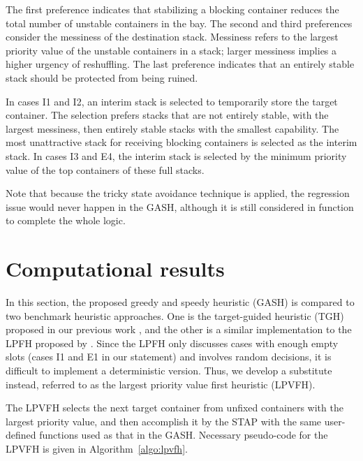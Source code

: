 \documentclass[review,3p,times,12pt,number]{elsarticle}\usepackage{amsmath}\usepackage{amssymb}
\begin{document}
The first preference indicates that stabilizing a blocking container reduces the total number of unstable containers in the bay. The second and third preferences consider the messiness of the destination stack. Messiness refers to the largest priority value of the unstable containers in a stack; larger messiness implies a higher urgency of reshuffling. The last preference indicates that an entirely stable stack should be protected from being ruined.

In cases I1 and I2, an interim stack is selected to temporarily store the target container. 
The selection prefers stacks that are not entirely stable, with the largest messiness, then entirely stable stacks with the smallest capability. The most unattractive stack for receiving blocking containers is selected as the interim stack. In cases I3 and E4, the interim stack is selected by the minimum priority value of the top containers of these full stacks.

Note that because the tricky state avoidance technique is applied, the regression issue would never happen in the GASH, although it is still considered in function  to complete the whole logic.

\section{Computational results}
\label{sec:experiment}

In this section, the proposed greedy and speedy heuristic (GASH) is compared to two benchmark heuristic approaches. One is the target-guided heuristic (TGH) proposed in our previous work \citep{wang2015}, and the other is a similar implementation to the LPFH proposed by \cite{exp2012}. Since the LPFH only discusses cases with enough empty slots (cases I1 and E1 in our statement) and involves random decisions, it is difficult to implement a deterministic version. Thus, we develop a substitute instead, referred to as the largest priority value first heuristic (LPVFH).

The LPVFH selects the next target container from unfixed containers with the largest priority value, and then accomplish it by the STAP with the same user-defined functions used as that in the GASH\@. Necessary pseudo-code for the LPVFH is given in Algorithm~\ref{algo:lpvfh}.
\end{document}
